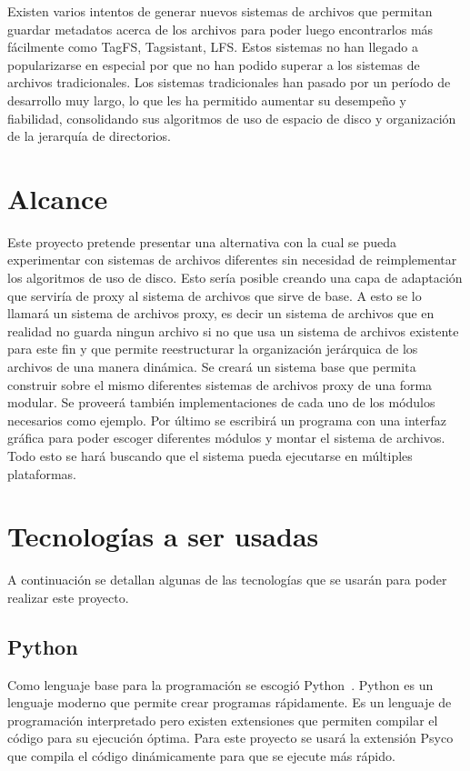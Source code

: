Existen varios intentos de generar nuevos sistemas de archivos que permitan guardar metadatos acerca de los archivos para poder luego encontrarlos más fácilmente como TagFS, Tagsistant, LFS. Estos sistemas no han llegado a popularizarse en especial por que no han podido superar a los sistemas de archivos tradicionales. Los sistemas tradicionales han pasado por un período de desarrollo muy largo, lo que les ha permitido aumentar su desempeño y fiabilidad, consolidando sus algoritmos de uso de espacio de disco y organización de la jerarquía de directorios.


\section{Alcance}

Este proyecto pretende presentar una alternativa con la cual se pueda experimentar con sistemas de archivos diferentes sin necesidad de reimplementar los algoritmos de uso de disco. Esto sería posible creando una capa de adaptación que serviría de proxy al sistema de archivos que sirve de base. A esto se lo llamará un sistema de archivos proxy, es decir un sistema de archivos que en realidad no guarda ningun archivo si no que usa un sistema de archivos existente para este fin y que permite reestructurar la organización jerárquica de los archivos de una manera dinámica. Se creará un sistema base que permita construir sobre el mismo diferentes sistemas de archivos proxy de una forma modular. Se proveerá también implementaciones de cada uno de los módulos necesarios como ejemplo. Por último se escribirá un programa con una interfaz gráfica para poder escoger diferentes módulos y montar el sistema de archivos. Todo esto se hará buscando que el sistema pueda ejecutarse en múltiples plataformas.


\section{Tecnologías a ser usadas}

A continuación se detallan algunas de las tecnologías que se usarán para poder realizar este proyecto.

\subsection{Python}

Como lenguaje base para la programación se escogió Python~\cite{python:website}. Python es un lenguaje moderno que permite crear programas rápidamente. Es un lenguaje de programación interpretado pero existen extensiones que permiten compilar el código para su ejecución óptima. Para este proyecto se usará la extensión Psyco~\cite{psyco:website} que compila el código dinámicamente para que se ejecute más rápido.

